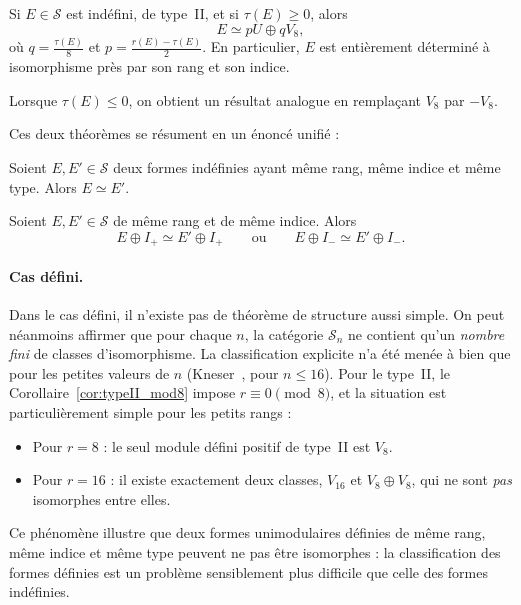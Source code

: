 \begin{theorem}
\label{thm:indefII}
Si $E \in \mathcal{S}$ est indéfini, de type~II, et si $\tau(E) \geq 0$, alors
\[
  E \simeq pU \oplus qV_8,
\]
où $q = \frac{\tau(E)}{8}$ et $p = \frac{r(E) - \tau(E)}{2}$.
En particulier, $E$ est entièrement déterminé à isomorphisme près par son rang et son
indice.
\end{theorem}

\begin{remark}
Lorsque $\tau(E) \leq 0$, on obtient un résultat analogue en remplaçant $V_8$ par
$-V_8$.
\end{remark}

Ces deux théorèmes se résument en un énoncé unifié :

\begin{theorem}
\label{thm:class_indef}
Soient $E, E' \in \mathcal{S}$ deux formes indéfinies ayant même rang, même indice et
même type. Alors $E \simeq E'$.
\end{theorem}

\begin{corollary}
Soient $E, E' \in \mathcal{S}$ de même rang et de même indice. Alors
\[
  E \oplus I_+ \simeq E' \oplus I_+ \qquad \text{ou} \qquad
  E \oplus I_- \simeq E' \oplus I_-.
\]
\end{corollary}

\paragraph{Cas défini.}
Dans le cas défini, il n'existe pas de théorème de structure aussi simple. On peut
néanmoins affirmer que pour chaque $n$, la catégorie $\mathcal{S}_n$ ne contient
qu'un \emph{nombre fini} de classes d'isomorphisme. La classification explicite n'a
été menée à bien que pour les petites valeurs de $n$ (Kneser~\cite{Kneser1957},
pour $n \leq 16$). Pour le type~II, le Corollaire~\ref{cor:typeII_mod8} impose
$r \equiv 0 \pmod 8$, et la situation est particulièrement simple pour les petits
rangs :

\begin{proposition}
\label{prop:defII_petits_rangs}
\begin{itemize}[nosep]
  \item Pour $r = 8$ : le seul module défini positif de type~II est $V_8$.
  \item Pour $r = 16$ : il existe exactement deux classes, $V_{16}$ et
  $V_8 \oplus V_8$, qui ne sont \emph{pas} isomorphes entre elles.
\end{itemize}
\end{proposition}

Ce phénomène illustre que deux formes unimodulaires définies de même rang, même
indice et même type peuvent ne pas être isomorphes : la classification des formes
définies est un problème sensiblement plus difficile que celle des formes indéfinies.
